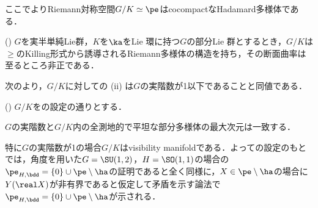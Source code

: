 ここでよりRiemann対称空間$G/K\simeq \pe$はcocompactなHadamard多様体である．
\begin{thm}(\cite[p.~241, Theorem~3.1]{hel01})\label{thm:non-positivity}
  $G$を実半単純Lie群，$K$を$\ka$をLie 環に持つ$G$の部分Lie 群とするとき，$G/K$は$\ge$のKilling形式から誘導されるRiemann多様体の構造を持ち，その断面曲率は至るところ非正である．
\end{thm}

次のより，$G/K$に対しての (ii) は$G$の実階数が1以下であることと同値である．

\begin{thm}({\cite[p.~245, Proposition~6.1]{hel01}})\label{thm:rank-of-symm-sp}
  $G/K$をの設定の通りとする．

  $G$の実階数と$G/K$内の全測地的で平坦な部分多様体の最大次元は一致する．
\end{thm}

特に$G$の実階数が1の場合$G/K$はvisibility manifoldである．よっての設定のもとでは，角度を用いた$G = \SU(1,2) $，$H= \SO(1,1)$の場合の$\pe_{H,\bdd} = \{0\}\cup\pe\setminus\ha $の証明であると全く同様に，$X\in \pe\setminus\ha $の場合に$Y(\real X) $が非有界であると仮定して矛盾を示す論法で$\pe_{H,\bdd} =\{0\}\cup\pe\setminus\ha $が示される．
